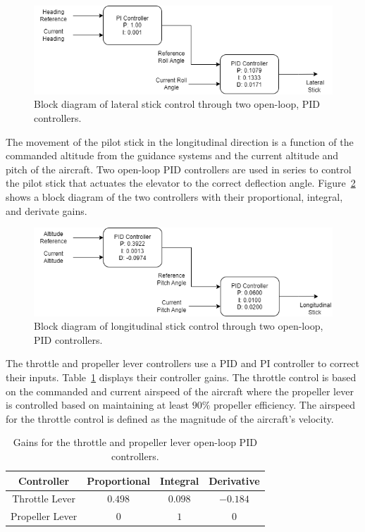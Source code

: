 \begin{figure}[!ht]
    \centering
    \includegraphics[width=0.75\linewidth]{Figures/latstickcontrol.drawio.png}
    \caption{Block diagram of lateral stick control through two open-loop, PID controllers.}\label{fig:latstickcontrol}
\end{figure}

The movement of the pilot stick in the longitudinal direction is a function of the commanded altitude from the guidance systems and the current altitude and pitch of the aircraft. Two open-loop PID controllers are used in series to control the pilot stick that actuates the elevator to the correct deflection angle. Figure~\ref{fig:longstickcontrol} shows a block diagram of the two controllers with their proportional, integral, and derivate gains.

\begin{figure}[!ht]
    \centering
    \includegraphics[width=0.75\linewidth]{Figures/longstickcontrol.drawio.png}
    \caption{Block diagram of longitudinal stick control through two open-loop, PID controllers.}\label{fig:longstickcontrol}
\end{figure}

The throttle and propeller lever controllers use a PID and PI controller to correct their inputs. Table~\ref{tbl:throttleProp} displays their controller gains. The throttle control is based on the commanded and current airspeed of the aircraft where the propeller lever is controlled based on maintaining at least \(90\% \) propeller efficiency. The airspeed for the throttle control is defined as the magnitude of the aircraft's velocity.

\begin{table}[!ht]
    \caption{Gains for the throttle and propeller lever open-loop PID controllers.}\label{tbl:throttleProp}
    \centering
    \begin{tabular}{cccc}
        \toprule
        Controller      & Proportional & Integral  & Derivative \\
        \midrule
        Throttle Lever  & \(0.498\)    & \(0.098\) & \(-0.184\) \\
        Propeller Lever & \(0\)        & \(1\)     & \(0\)      \\
        \bottomrule
    \end{tabular}
\end{table}

